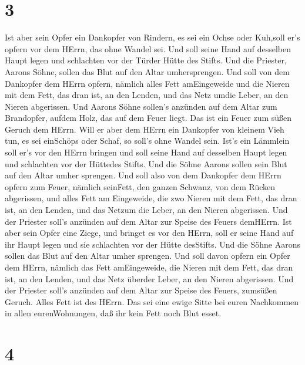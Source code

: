 \hypertarget{section-2}{%
\section{3}\label{section-2}}

 Ist aber sein Opfer ein Dankopfer von Rindern, es sei ein
Ochse oder Kuh,soll er's opfern vor dem HErrn, das ohne Wandel sei.
 Und soll seine Hand auf desselben Haupt legen und
schlachten vor der Türder Hütte des Stifts. Und die Priester, Aarons
Söhne, sollen das Blut auf den Altar umhersprengen.  Und
soll von dem Dankopfer dem HErrn opfern, nämlich alles Fett amEingeweide
 und die Nieren mit dem Fett, das dran ist, an den Lenden,
und das Netz umdie Leber, an den Nieren abgerissen.  Und
Aarons Söhne sollen's anzünden auf dem Altar zum Brandopfer, aufdem
Holz, das auf dem Feuer liegt. Das ist ein Feuer zum süßen Geruch dem
HErrn.  Will er aber dem HErrn ein Dankopfer von kleinem
Vieh tun, es sei einSchöps oder Schaf, so soll's ohne Wandel sein.
 Ist's ein Lämmlein soll er's vor den HErrn bringen
 und soll seine Hand auf desselben Haupt legen und
schlachten vor der Hüttedes Stifts. Und die Söhne Aarons sollen sein
Blut auf den Altar umher sprengen.  Und soll also von dem
Dankopfer dem HErrn opfern zum Feuer, nämlich seinFett, den ganzen
Schwanz, von dem Rücken abgerissen, und alles Fett am Eingeweide,
 die zwo Nieren mit dem Fett, das dran ist, an den Lenden,
und das Netzum die Leber, an den Nieren abgerissen.  Und
der Priester soll's anzünden auf dem Altar zur Speise des Feuers
demHErrn.  Ist aber sein Opfer eine Ziege, und bringet es
vor den HErrn,  soll er seine Hand auf ihr Haupt legen und
sie schlachten vor der Hütte desStifts. Und die Söhne Aarons sollen das
Blut auf den Altar umher sprengen.  Und soll davon opfern
ein Opfer dem HErrn, nämlich das Fett amEingeweide,  die
Nieren mit dem Fett, das dran ist, an den Lenden, und das Netz überder
Leber, an den Nieren abgerissen.  Und der Priester soll's
anzünden auf dem Altar zur Speise des Feuers, zumsüßen Geruch. Alles
Fett ist des HErrn.  Das sei eine ewige Sitte bei euren
Nachkommen in allen eurenWohnungen, daß ihr kein Fett noch Blut esset.

\hypertarget{section-3}{%
\section{4}\label{section-3}}

